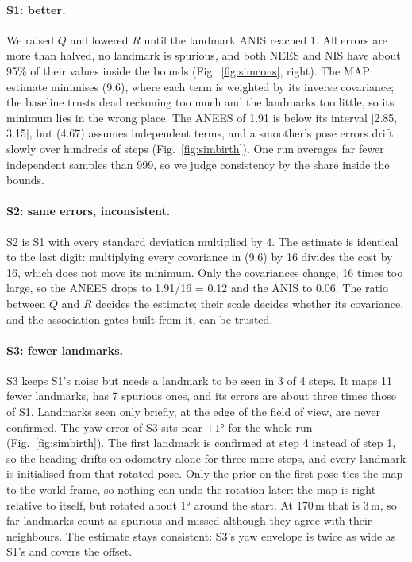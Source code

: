 \documentclass[11pt,a4paper]{article}
\newcommand{\figref}[1]{Fig.~\ref{#1}}
\begin{document}
\paragraph{S1: better.} We raised \(Q\) and lowered \(R\) until the landmark ANIS reached 1. All errors are more than halved, no landmark is spurious, and both NEES and NIS have about 95\% of their values inside the bounds (\figref{fig:simcons}, right). The MAP estimate minimises (9.6), where each term is weighted by its inverse covariance; the baseline trusts dead reckoning too much and the landmarks too little, so its minimum lies in the wrong place. The ANEES of 1.91 is below its interval [2.85, 3.15], but (4.67) assumes independent terms, and a smoother's pose errors drift slowly over hundreds of steps (\figref{fig:simbirth}). One run averages far fewer independent samples than 999, so we judge consistency by the share inside the bounds.

\paragraph{S2: same errors, inconsistent.} S2 is S1 with every standard deviation multiplied by 4. The estimate is identical to the last digit: multiplying every covariance in (9.6) by 16 divides the cost by 16, which does not move its minimum. Only the covariances change, 16 times too large, so the ANEES drops to 1.91/16 = 0.12 and the ANIS to 0.06. The ratio between \(Q\) and \(R\) decides the estimate; their scale decides whether its covariance, and the association gates built from it, can be trusted.

\paragraph{S3: fewer landmarks.} S3 keeps S1's noise but needs a landmark to be seen in 3 of 4 steps. It maps 11 fewer landmarks, has 7 spurious ones, and its errors are about three times those of S1. Landmarks seen only briefly, at the edge of the field of view, are never confirmed. The yaw error of S3 sits near \(+1°\) for the whole run (\figref{fig:simbirth}). The first landmark is confirmed at step 4 instead of step 1, so the heading drifts on odometry alone for three more steps, and every landmark is initialised from that rotated pose. Only the prior on the first pose ties the map to the world frame, so nothing can undo the rotation later: the map is right relative to itself, but rotated about 1° around the start. At 170\,m that is 3\,m, so far landmarks count as spurious and missed although they agree with their neighbours. The estimate stays consistent: S3's yaw envelope is twice as wide as S1's and covers the offset.
\end{document}
